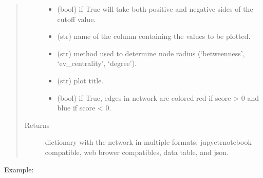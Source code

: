 \documentclass[letterpaper,10pt,english]{sphinxmanual}
\begin{document}
\begin{fulllineitems}
\begin{quote}
\begin{description}
\begin{itemize}
\item {} 
 (bool) \textendash{} if True will take both positive and negative sides of the cutoff value.

\item {} 
 (str) \textendash{} name of the column containing the values to be plotted.

\item {} 
 (str) \textendash{} method used to determine node radius (‘betweenness’, ‘ev\_centrality’, ‘degree’).

\item {} 
 (str) \textendash{} plot title.

\item {} 
 (bool) \textendash{} if True, edges in network are colored red if score \textgreater{} 0 and blue if score \textless{} 0.

\end{itemize}

\item[{Returns}] \leavevmode
dictionary with the network in multiple formats: jupyetr\sphinxhyphen{}notebook compatible, web brower compatibles, data table, and json.

\end{description}\end{quote}

Example:

\begin{sphinxVerbatim}[commandchars=\\\{\}]
                                        
\end{sphinxVerbatim}

\end{fulllineitems}
\end{document}
